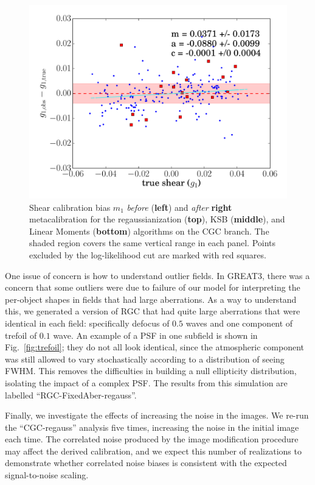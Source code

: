 \documentclass[iop]{emulateapj}
\begin{document}
\begin{figure}[t]
\begin{center}
\includegraphics[width=0.46\linewidth]{./Plots/m1-moments-opt-shear_plots.pdf}
\end{center}
\caption{Shear calibration bias $m_1$ {\it before} ({\bf left}) and
  {\it after} {\bf right} metacalibration for the regaussianization
  ({\bf top}), KSB ({\bf middle}), and Linear Moments ({\bf bottom})
  algorithms on the CGC branch. The shaded region covers the same
  vertical range in each panel.  Points excluded by the log-likelihood
  cut are marked with red squares.}
\label{fig:m_comparison}
\end{figure}

One issue of concern is how to understand outlier fields.  In GREAT3,
there was a concern that some outliers were due to failure of our
model for interpreting the per-object shapes in fields that had large
aberrations. 
As a way to understand this, we generated a version of RGC that had
quite large aberrations that were identical in each field:
specifically defocus of $0.5$ waves and one component of trefoil of
$0.1$ wave.  An example of a PSF in one subfield is shown in
Fig.~\ref{fig:trefoil}; they do not all look identical, since the
atmospheric component was still allowed to vary stochastically
according to a distribution of seeing FWHM. This removes the difficulties
in building a null ellipticity distribution, isolating the impact of a
complex PSF. The results from this simulation are labelled
``RGC-FixedAber-regauss''.


Finally, we investigate the effects of increasing the noise in the
images. We re-run the ``CGC-regauss'' analysis five times, increasing
the noise in the initial image each time. The correlated noise
produced by the image modification procedure may affect the derived
calibration, and we expect this number of realizations to demonstrate
whether correlated noise biases is consistent with the expected 
signal-to-noise scaling. %
%
\end{document}
